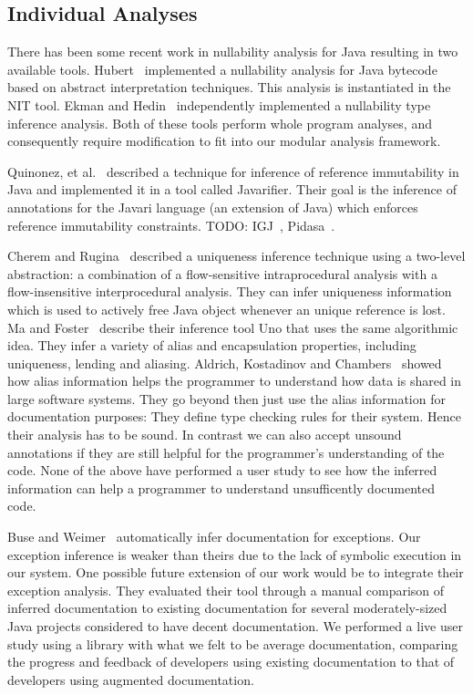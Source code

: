 \subsection{Individual Analyses}

There has been some recent work in nullability analysis for Java
resulting in two available tools.  Hubert~\cite{NIT} implemented a nullability
analysis for Java bytecode based on abstract interpretation techniques.  This
analysis is instantiated in the {\sc NIT} tool.  Ekman and
Hedin~\cite{NonNullTypeInference} independently implemented a nullability type
inference analysis.  Both of these tools perform whole program analyses, and
consequently require modification to fit into our modular analysis framework.

Quinonez, et al.~\cite{Javarifier} described a technique for inference of
reference immutability in Java and implemented it in a tool called {\sc
  Javarifier}. Their goal is the inference of annotations for the {\sc Javari}
language (an extension of Java) which enforces reference immutability
constraints. TODO: IGJ~\cite{IGJ}, Pidasa~\cite{Pidasa}.

Cherem and Rugina~\cite{UniquenessInference} described a uniqueness inference
technique using a two-level abstraction: a combination of a flow-sensitive
intraprocedural analysis with a flow-insensitive interprocedural analysis. 
They can infer uniqueness information which is used to actively free Java
object whenever an unique reference is lost.  Ma and
Foster~\cite{Uno} describe their inference tool Uno that uses the same
algorithmic idea. They infer a variety of alias and encapsulation
properties, including uniqueness, lending and aliasing.  Aldrich,
Kostadinov and Chambers~\cite{AliasJava} showed how alias information helps the
programmer to understand how data is shared in large software systems.
They go beyond then just use the alias information for documentation purposes:
They define type checking rules for their system. Hence their analysis has to be
sound. In contrast we can also accept unsound annotations if they are still helpful for the 
programmer's understanding of the code. None of the above
have performed a user study to see how the inferred information can help a
programmer to understand unsufficently documented code.

Buse and Weimer~\cite{autodoc} automatically infer documentation for
exceptions.  Our exception inference is weaker than theirs due to the lack of
symbolic execution in our system.  One
possible future extension of our work would be to integrate their exception
analysis.  They evaluated their tool through a manual comparison of inferred documentation to
existing documentation for several moderately-sized Java projects considered to
have decent documentation.  We performed a live user study using a library with what
we felt to be average documentation, comparing the progress and feedback of
developers using existing documentation to that of developers using augmented
documentation.

